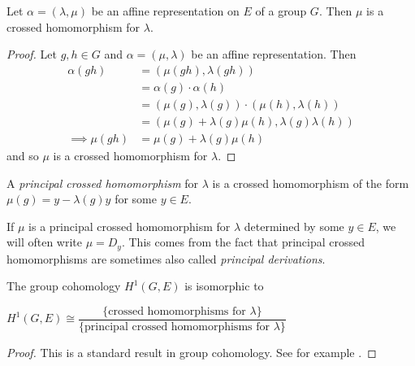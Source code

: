 \begin{prop}
    Let $\alpha = (\lambda, \mu)$ be an affine representation on $E$ of a group $G$. Then
    $\mu$ is a crossed homomorphism for $\lambda$.
\end{prop}
\begin{proof}
    Let $g,h \in G$ and $\alpha = (\mu, \lambda)$ be an affine representation. Then
    \begin{align*}
        \alpha(gh)       & = (\mu(gh), \lambda(gh))                            \\
                         & =\alpha(g)\cdot \alpha(h)                           \\
                         & = (\mu(g), \lambda(g)) \cdot(\mu(h), \lambda(h))    \\
                         & = (\mu(g) + \lambda(g)\mu(h), \lambda(g)\lambda(h)) \\
        \implies \mu(gh) & = \mu(g) + \lambda(g)\mu(h)
    \end{align*}
    and so $\mu$ is a crossed homomorphism for $\lambda$.
\end{proof}

\begin{definition}
    A \textit{principal crossed homomorphism} for $\lambda$ is a crossed homomorphism
    of the form $\mu(g) = y- \lambda(g)y$ for some $y \in E$.
\end{definition}
\begin{remark}
    If $\mu$ is a principal crossed homomorphism for $\lambda$ determined by some $y\in E$, we will often write $\mu = D_y$. This comes from the fact that
    principal crossed homomorphisms are sometimes also called \emph{principal derivations}.
\end{remark}

\begin{lemma}
    The group cohomology $H^1(G, E)$ is isomorphic to
    \begin{center}
        $H^1(G,E) \cong \dfrac{\{\text{crossed homomorphisms for } \lambda\}}{\{\text{principal crossed homomorphisms for } \lambda\}}$
    \end{center}
    \label{lemma:crossed-coho}
\end{lemma}

\begin{proof}
    This is a standard result in group cohomology. See for example \cite{tomczak2023groupcohomology}.
\end{proof}

